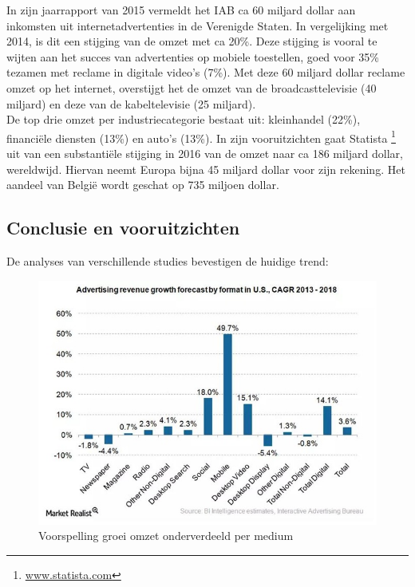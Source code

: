 \documentclass[pdftex,a4paper,12pt,twoside]{report}
\begin{document}
In zijn jaarrapport van 2015 vermeldt het IAB ca 60 miljard dollar aan inkomsten uit internetadvertenties in de Verenigde Staten. In vergelijking met 2014, is dit een stijging van de omzet met ca 20\%. Deze stijging is vooral te wijten aan het succes van advertenties op mobiele toestellen, goed voor 35\% tezamen met reclame in digitale video’s (7\%). 
Met deze 60 miljard dollar reclame omzet op het internet, overstijgt het de omzet van de broadcasttelevisie (40 miljard) en deze van de kabeltelevisie (25 miljard).
\\
De top drie omzet per industriecategorie bestaat uit: kleinhandel (22\%), financiële diensten (13\%) en auto’s (13\%). 
In zijn vooruitzichten gaat Statista \footnote{\url{www.statista.com}} uit van een substantiële stijging in 2016 van de omzet naar ca 186 miljard dollar, wereldwijd. Hiervan neemt Europa bijna 45 miljard dollar voor zijn rekening. Het aandeel van België wordt geschat op 735 miljoen dollar.

\subsection{Conclusie en vooruitzichten }
\label{Conclusie en vooruitzichten }
De analyses van verschillende studies \citep{Silverman2015,BI-Insider2016, EMarketer2016, pwc2015} bevestigen de huidige trend:

\begin{figure}[h!]
\centering
\includegraphics[width=12cm]{img/advRevGrowthFormat}
\caption{Voorspelling groei omzet onderverdeeld per medium}
\label{fig: Advertising revenue growth forecast by format (Business Insider, 2014)}
\end{figure} 
\end{document}
